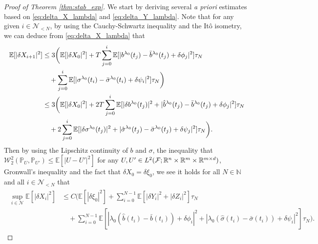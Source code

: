 \documentclass[11pt]{article}
\numberwithin{equation}{section}
\theoremstyle{definition}
\theoremstyle{remark}
\def\l{\label}  \def\f{\frac}  \def\fa{\forall}
\def\cF{\mathcal{F}}
\def\cN{\mathcal{N}}
\def\cW{\mathcal{W}}
\def\sE{{\mathbb{E}}}
\def\sN{{\mathbb{N}}}
\def\sP{\mathbb{P}}
\def\sR{{\mathbb R}}
\begin{document}
\begin{proof}[Proof of Theorem \ref{thm:stab_exp}]
We start by deriving several \textit{a priori} estimates based on \eqref{eq:delta_X_lambda} and \eqref{eq:delta_Y_lambda}.
Note that for any given  $i\in \cN_{<N}$, 
by using  the Cauchy-Schwartz inequality 
and the It\^{o} isometry,
we can deduce from  \eqref{eq:delta_X_lambda} that 
\begin{align*}
\sE[|\delta X_{i+1}|^2]
&\le 3
\bigg(
\sE[|\delta X_{0}|^2]
+T\sum_{j=0}^{i}\sE[|b^{\lambda_0}(t_{j})-\bar{b}^{\lam_0}(t_{j})+\delta \phi_{j}|^2]\tau_N
\\
&\quad
+\sum_{j=0}^{i}\sE[|\sigma^{\lambda_0}(t_i)-\bar{\sigma}^{\lambda_0}(t_i)+\delta \psi_{i}|^2]\tau_N
\bigg)
\\
&\le 3
\bigg(
\sE[|\delta X_{0}|^2]
+2T\sum_{j=0}^{i}\sE[|\delta b^{\lambda_0}(t_{j})|^2+|\hat{b}^{\lambda_0}(t_{j})-\bar{b}^{\lam_0}(t_{j})+\delta \phi_{j}|^2]\tau_N
\\
&\quad
+2\sum_{j=0}^{i}\sE[|\delta \sigma^{\lambda_0}(t_j)|^2+|\hat{\sigma}^{\lambda_0}(t_j)-\bar{\sigma}^{\lambda_0}(t_j)+\delta \psi_{j}|^2]\tau_N
\bigg).
\end{align*}
Then by using the Lipschitz continuity of $b$ and $\sigma$,
the inequality that $\cW^2_2(\sP_{U},\sP_{U'})\le \sE[|U-U'|^2]$
for any $U,U'\in L^2(\cF;\sR^n\t \sR^m\t \sR^{m\t d})$,
 Gronwall's inequality
and the fact that $\delta X_0=\delta \xi_0$, 
 we see it holds for all $N\in \sN$
and  all $i\in \cN_{<N}$
that
\begin{align}\l{eq:deltaX_stab}
\begin{split}
\sup_{i\in \cN}\sE[|\delta X_{i}|^2]
&\le C
\bigg(
\sE[|\delta \xi_{0}|^2]
+
\sum_{i=0}^{N-1}\sE[|\delta{Y}_{i}|^2+|\delta{Z}_{i}|^2
]\tau_N
\\
&\quad
+\sum_{i=0}^{N-1}\sE[|\lambda_0(\hat{b}(t_{i})-\bar{b}(t_{i}))+\delta \phi_{i}|^2
+|\lambda_0(\hat{\sigma}(t_i)-\bar{\sigma}(t_i))+\delta \psi_{i}|^2]\tau_N
\bigg).
\end{split}
\end{align}




  









\end{proof}
\end{document}
